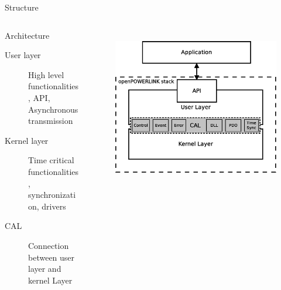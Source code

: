 \begin{frame}{Structure}
    \begin{columns}
        \begin{column}{0.5\textwidth}
            \begin{block}{Architecture}
                \begin{description}
                    \item[User layer] High level functionalities, API, Asynchronous transmission
                    \item[Kernel layer] Time critical functionalities, synchronization, drivers
                    \item[CAL] Connection between user layer and kernel Layer
                \end{description}
            \end{block}
        \end{column}
        
        \begin{column}{0.5\textwidth}
            \begin{figure}
                \hbox{
                \hspace{-2ex}
                \includegraphics[width=1.2\textwidth]{../../thesis/images/openpowerlink_arch.eps}}
            \end{figure}
        \end{column}
    \end{columns}
\end{frame}

